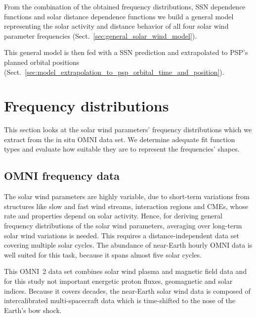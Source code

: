 From the combination of the obtained frequency distributions, SSN dependence functions and solar distance dependence functions we build a general model representing the solar activity and distance behavior of all four solar wind parameter frequencies (Sect.~\ref{sec:general_solar_wind_model}).

This general model is then fed with a SSN prediction and extrapolated to PSP's planned orbital positions (Sect.~\ref{sec:model_extrapolation_to_psp_orbital_time_and_position}).\\


\section{Frequency distributions}
\label{sec:frequency_distribution}

This section looks at the solar wind parameters' frequency distributions which we extract from the in situ OMNI data set. We determine adequate fit function types and evaluate how suitable they are to represent the frequencies' shapes.

\subsection{OMNI frequency data}
\label{sec:omni_frequency_data}
The solar wind parameters are highly variable, due to short-term variations from structures like slow and fast wind streams, interaction regions and CMEs, whose rate and properties depend on solar activity. Hence, for deriving general frequency distributions of the solar wind parameters, averaging over long-term solar wind variations is needed. This requires a distance-independent data set covering multiple solar cycles. The abundance of near-Earth hourly OMNI data is well suited for this task, because it spans almost five solar cycles.

This OMNI~2 data set \citep{King2005} combines solar wind plasma and magnetic field data and for this study not important energetic proton fluxes, geomagnetic and solar indices. Because it covers decades, the near-Earth solar wind data is composed of intercalibrated multi-spacecraft data which is time-shifted to the nose of the Earth's bow shock.

